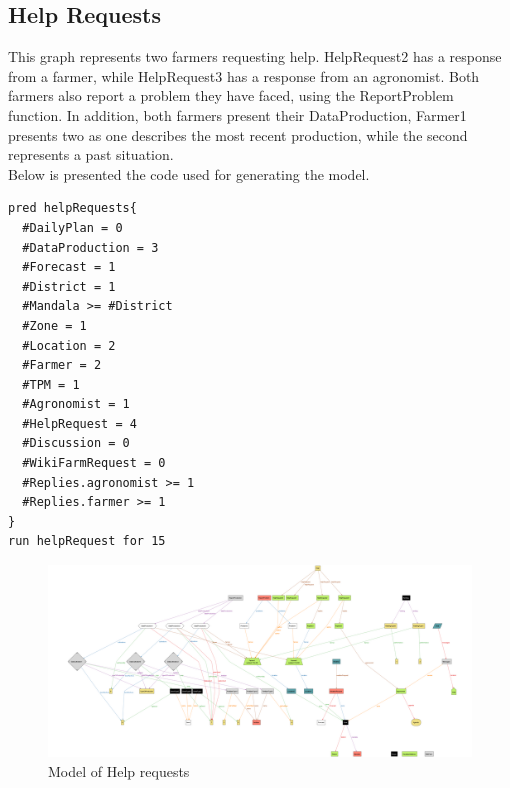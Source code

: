 \newline

\subsection{Help Requests}
This graph represents two farmers requesting help. HelpRequest2 has a response from a farmer, while HelpRequest3 has a response from an agronomist. Both farmers also report a problem they have faced, using the ReportProblem function. In addition, both farmers present their DataProduction, Farmer1 presents two as one describes the most recent production, while the second represents a past situation.\\
Below is presented the code used for generating the model.
\begin{lstlisting}[language=alloy]
pred helpRequests{
  #DailyPlan = 0
  #DataProduction = 3
  #Forecast = 1
  #District = 1
  #Mandala >= #District
  #Zone = 1
  #Location = 2
  #Farmer = 2
  #TPM = 1
  #Agronomist = 1
  #HelpRequest = 4
  #Discussion = 0
  #WikiFarmRequest = 0
  #Replies.agronomist >= 1
  #Replies.farmer >= 1
}
run helpRequest for 15
\end{lstlisting}
\begin{figure}[H]
\centering
	\includegraphics[angle=90,height=1.5\textwidth]{Images/Model/model2.png}
	\caption{Model of Help requests}
\end{figure}

